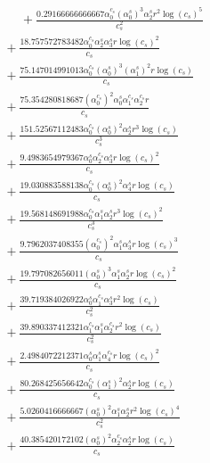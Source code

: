 \documentclass[10pt]{article}
\begin{document}
\begin{align*}
\phantom{R_{3,9}} &\phantom{={}}{}  + \frac{0.29166666666667 \alpha_{0}^{c_s} \left(\alpha_{0}^s\right)^{3} \alpha_{2}^s r^{2} \log{\left(c_{s} \right)}^{5}}{c_{s}^{2}} \\
&{}  + \frac{18.757572783482 \alpha_{0}^{c_s} \alpha_{2}^s \alpha_{3}^s r \log{\left(c_{s} \right)}^{2}}{c_{s}} \\
&{}  + \frac{75.147014991013 \alpha_{0}^{c_s} \left(\alpha_{0}^s\right)^{3} \left(\alpha_{1}^s\right)^{2} r \log{\left(c_{s} \right)}}{c_{s}} \\
&{}  + \frac{75.354280818687 \left(\alpha_{0}^{c_s}\right)^{2} \alpha_{0}^s \alpha_{1}^{c_s} \alpha_{2}^{c_s} r}{c_{s}} \\
&{}  + \frac{151.52567112483 \alpha_{0}^{c_s} \left(\alpha_{0}^s\right)^{2} \alpha_{2}^s r^{3} \log{\left(c_{s} \right)}}{c_{s}^{3}} \\
&{}  + \frac{9.4983654979367 \alpha_{0}^s \alpha_{2}^{c_s} \alpha_{3}^s r \log{\left(c_{s} \right)}^{2}}{c_{s}} \\
&{}  + \frac{19.030883588138 \alpha_{0}^{c_s} \left(\alpha_{0}^s\right)^{2} \alpha_{4}^s r \log{\left(c_{s} \right)}}{c_{s}} \\
&{}  + \frac{19.568148691988 \alpha_{0}^{c_s} \alpha_{1}^s \alpha_{2}^s r^{3} \log{\left(c_{s} \right)}^{2}}{c_{s}^{3}} \\
&{}  + \frac{9.7962037408355 \left(\alpha_{0}^{c_s}\right)^{2} \alpha_{1}^s \alpha_{3}^s r \log{\left(c_{s} \right)}^{3}}{c_{s}} \\
&{}  + \frac{19.797082656011 \left(\alpha_{0}^s\right)^{3} \alpha_{1}^s \alpha_{2}^s r \log{\left(c_{s} \right)}^{2}}{c_{s}} \\
&{}  + \frac{39.719384026922 \alpha_{0}^s \alpha_{1}^{c_s} \alpha_{3}^s r^{2} \log{\left(c_{s} \right)}}{c_{s}^{2}} \\
&{}  + \frac{39.890337412321 \alpha_{1}^{c_s} \alpha_{1}^s \alpha_{2}^{c_s} r^{2} \log{\left(c_{s} \right)}}{c_{s}^{2}} \\
&{}  + \frac{2.4984072212371 \alpha_{0}^s \alpha_{1}^s \alpha_{4}^{c_s} r \log{\left(c_{s} \right)}^{2}}{c_{s}} \\
&{}  + \frac{80.268425656642 \alpha_{0}^{c_s} \left(\alpha_{1}^s\right)^{2} \alpha_{2}^s r \log{\left(c_{s} \right)}}{c_{s}} \\
&{}  + \frac{5.0260416666667 \left(\alpha_{0}^s\right)^{2} \alpha_{1}^s \alpha_{2}^s r^{2} \log{\left(c_{s} \right)}^{4}}{c_{s}^{2}} \\
&{}  + \frac{40.385420172102 \left(\alpha_{0}^s\right)^{2} \alpha_{2}^{c_s} \alpha_{2}^s r \log{\left(c_{s} \right)}}{c_{s}} \\

\end{align*}
\end{document}
